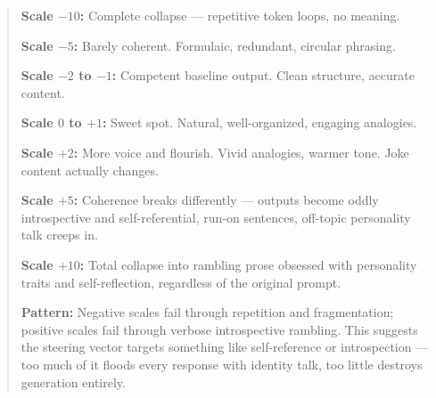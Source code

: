 \begin{quote}
\textbf{Scale $-10$:} Complete collapse --- repetitive token loops, no meaning.

\textbf{Scale $-5$:} Barely coherent. Formulaic, redundant, circular phrasing.

\textbf{Scale $-2$ to $-1$:} Competent baseline output. Clean structure, accurate content.

\textbf{Scale $0$ to $+1$:} Sweet spot. Natural, well-organized, engaging analogies.

\textbf{Scale $+2$:} More voice and flourish. Vivid analogies, warmer tone. Joke content actually changes.

\textbf{Scale $+5$:} Coherence breaks differently --- outputs become oddly introspective and self-referential, run-on sentences, off-topic personality talk creeps in.

\textbf{Scale $+10$:} Total collapse into rambling prose obsessed with personality traits and self-reflection, regardless of the original prompt.

\textbf{Pattern:} Negative scales fail through repetition and fragmentation; positive scales fail through verbose introspective rambling. This suggests the steering vector targets something like self-reference or introspection --- too much of it floods every response with identity talk, too little destroys generation entirely.
\end{quote}
\FloatBarrier